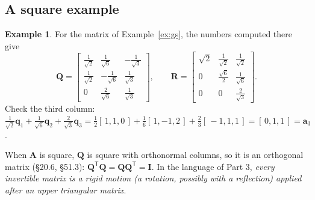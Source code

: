 \documentclass[11pt]{article}
\theoremstyle{plain}
\theoremstyle{definition}
\newtheorem{ex}{Example}[section]
\theoremstyle{remark}
\newcommand{\vc}[1]{\mathbf{#1}}
\newcommand{\mt}[1]{\mathbf{#1}}
\newcommand{\T}{^{\mathsf{T}}}
\begin{document}
\subsection{A square example}
\begin{ex}
\label{ex:qrsq}
For the matrix of Example~\ref{ex:gs}, the numbers computed there give
\[
  \mt{Q}=\begin{bmatrix}\frac{1}{\sqrt2}&\frac{1}{\sqrt6}&-\frac{1}{\sqrt3}\\[3pt]
                        \frac{1}{\sqrt2}&-\frac{1}{\sqrt6}&\frac{1}{\sqrt3}\\[3pt]
                        0&\frac{2}{\sqrt6}&\frac{1}{\sqrt3}\end{bmatrix},
  \qquad
  \mt{R}=\begin{bmatrix}\sqrt2&\frac{1}{\sqrt2}&\frac{1}{\sqrt2}\\[3pt]
                        0&\frac{\sqrt6}{2}&\frac{1}{\sqrt6}\\[3pt]
                        0&0&\frac{2}{\sqrt3}\end{bmatrix}.
\]
Check the third column:
$\frac{1}{\sqrt2}\vc{q}_1+\frac{1}{\sqrt6}\vc{q}_2+\frac{2}{\sqrt3}\vc{q}_3
=\frac12[\,1,1,0\,]+\frac16[\,1,-1,2\,]+\frac23[\,-1,1,1\,]=[\,0,1,1\,]=\vc{a}_3$.
\checkmark
\end{ex}

\noindent When $\mt{A}$ is square, $\mt{Q}$ is square with orthonormal columns, so
it is an orthogonal matrix (\S20.6, \S51.3): $\mt{Q}\T\mt{Q}=\mt{Q}\mt{Q}\T=\mt{I}$.
In the language of Part 3, \emph{every invertible matrix is a rigid motion (a
rotation, possibly with a reflection) applied after an upper triangular matrix}.

\end{document}
